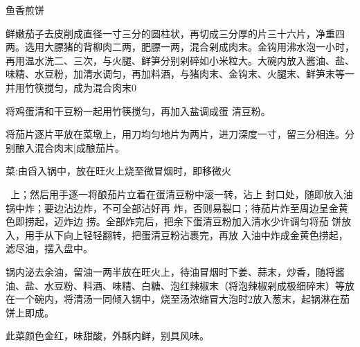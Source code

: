 \begin{recipe}{鱼香煎饼}

\ingredients


\cooking

\step 鲜嫩茄子去皮削成直径一寸三分的圆柱状，再切成三分厚的片三十六片，净重四两。选用大膘猪的背柳肉二两，肥膘一两，混合剁成肉末。金钩用沸水泡一小时，再用温水洗二、三次，与火腿、鲜笋分别剁碎如小米粒大。大碗内放入酱油、盐、味精、水豆粉，加清水调匀，再加料酒，与猪肉末、金钩末、火腿末、鲜笋末等一并用竹筷搅匀，成为混合肉末0

将鸡蛋清和干豆粉一起用竹筷搅匀，再加入盐调成蛋 清豆粉。

\step 将茄片逐片平放在菜墩上，用刀均匀地片为两片，进刀深度一寸，留三分相连。分别酿入混合肉末|成酿茄片。

\step 菜:由舀入锅中，放在旺火上烧至微冒烟时，即移微火

~上；然后用手逐一将酿茄片立着在蛋清豆粉中滚一转，沾上 封口处，随即放入油锅中炸；要边沾边炸，不可全部沾好再 炸，否则易裂口；待茄片炸至周边呈金黄色即捞起，迈炸边 捞。全部炸完后，把余下蛋清豆粉加入清水少许调匀将茄 饼放入，用手从下向上轻轻翻转，把蛋清豆粉沾裹完，再放 入油中炸成金黄色捞起，滤尽油，摆入盘中。

\step 锅内泌去余油，留油一两半放在旺火上，待油冒烟时下姜、蒜末，炒香，随将酱油、盐、水豆粉、料酒、味精、白糖、泡红辣椒末（将泡辣椒剁成极细碎末）等放在一个碗内，将清汤一同倾入锅中，烧至汤浓缩冒大泡时2放入葱末，起锅淋在茄饼上即成。

\notes

此菜颜色金红，味甜酸，外酥内鲜，别具风味。

\end{recipe}

